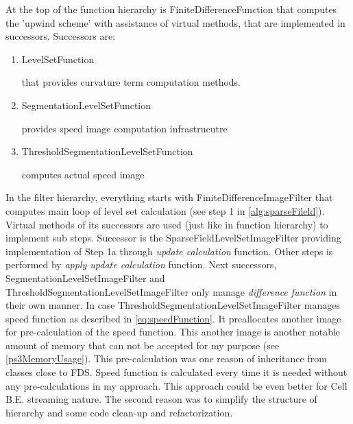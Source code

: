 At the top of the function hierarchy is FiniteDifferenceFunction that computes the 'upwind scheme' with assistance of virtual methods, that are implemented in successors.
Successors are:
\begin{enumerate}
  \item{LevelSetFunction}
  \par
  that provides curvature term computation methods.

\item{SegmentationLevelSetFunction}
\par
provides speed image computation infrastrucutre

\item{ThresholdSegmentationLevelSetFunction}
\par
computes actual speed image
\end{enumerate}

In the filter hierarchy, everything starts with FiniteDifferenceImageFilter that computes main loop of level set calculation (see step 1 in \ref{alg:sparseFileld}).
Virtual methods of its successors are used (just like in function hierarchy) to implement sub steps.
Successor is the SparseFieldLevelSetImageFilter providing implementation of Step 1a through \emph{update calculation} function.
Other steps is performed by \emph{apply update calculation} function.
Next successors, SegmentationLevelSetImageFilter and ThresholdSegmentationLevelSetImageFilter only manage \emph{difference function} in their own manner.
In case ThresholdSegmentationLevelSetImageFilter manages speed function as described in \ref{eq:speedFunction}.
It preallocates another image for pre-calculation of the speed function.
This another image is another notable amount of memory that can not be accepted for my purpose (see \ref{ps3MemoryUsage}).
This pre-calculation was one reason of inheritance from classes close to FDS.
Speed function is calculated every time it is needed without any pre-calculations in my approach.
This approach could be even better for Cell B.E. streaming nature.
The second reason was to simplify the structure of hierarchy and some code clean-up and refactorization.

